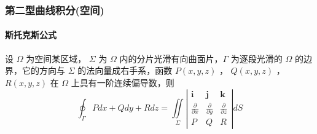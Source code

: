 ﻿\documentclass[a4paper,12pt,UTF8]{ctexart}
\begin{document}
    \subsubsection{第二型曲线积分(空间)}
    \paragraph{斯托克斯公式} 设 \(\Omega\) 为空间某区域， \(\Sigma \) 为 \(\Omega \) 内的分片光滑有向曲面片，\(\Gamma \) 为逐段光滑的 \(\Omega \) 的边界，它的方向与 \(\Sigma \) 的法向量成右手系，函数 \(P(x, y, z)\) ， \(Q(x, y, z)\) ， \(R(x, y, z)\) 在 \(\Omega\) 上具有一阶连续偏导数，则
    \[\oint_{\Gamma }Pdx+Qdy+Rdz = \iint \limits_{\Sigma }\left|\begin{array}{cccc}
        \mathbf{i}& \mathbf{j}& \mathbf{k}\\
        \frac{\partial}{\partial x}& \frac{\partial}{\partial y}& \frac{\partial}{\partial z}\\
        P& Q& R
    \end{array}\right|dS\]
\end{document}
